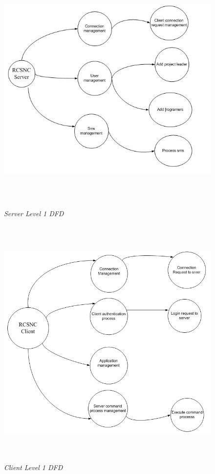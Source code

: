 \newpage
\begin{figure}[h!]
\centering
\includegraphics[height=5in, width = 5in]{pic1.jpg}
\caption{\emph{Server Level 1 DFD}}
\label{fig:1}
\end{figure}
\newpage
\begin{figure}[h!]
\centering
\includegraphics[height=5in, width = 5in]{pict.jpg}
\caption{\emph{Client Level 1 DFD}}
\label{fig:1}
\end{figure}
